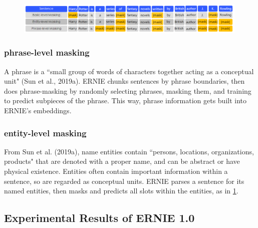 \begin{figure}[h]
\vspace{-5pt}
\centering
\includegraphics[width=0.99\textwidth]{imgs/ernie_maskingtypes.png}
\vspace{-5pt}
\vspace{-5pt}
\label{fig:ernie_maskingTypes}
\end{figure}




\subsubsection{phrase-level masking}\label{sec:phrasemasking}

A phrase is a ``small group of words of characters together acting as a conceptual unit" (Sun et al., 2019a). ERNIE chunks sentences by phrase boundaries, then does phrase-masking by randomly selecting phrases, masking them, and training to predict subpieces of the phrase. This way, phrase information gets built into ERNIE's embeddings. 


\subsubsection{entity-level masking}\label{sec:entitymasking}

From Sun et al. (2019a), name entities contain ``persons, locations, organizations, products" that are denoted with a proper name, and can be abstract or have physical existence. Entities often contain important information within a sentence, so are regarded as conceptual units. ERNIE parses a sentence for its named entities, then masks and predicts all slots within the entities, as in \cref{fig:ernie_maskingTypes}.


\subsection{Experimental Results of ERNIE 1.0}\label{sec:ExperimentalResultsERNIE}


